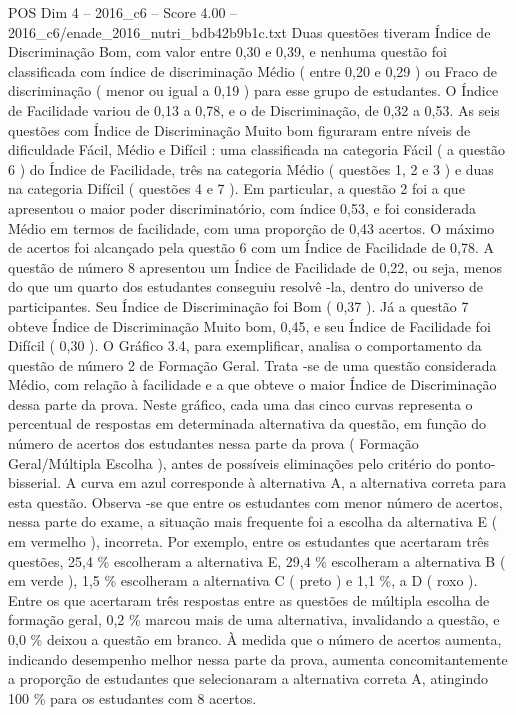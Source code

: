 \begin{textsample}{POS Dim 4 – 2016\_c6 – Score 4.00 – 2016\_c6/enade\_2016\_nutri\_bdb42b9b1c.txt}
Duas questões tiveram Índice de Discriminação Bom, com valor entre 0,30 e 0,39, e nenhuma questão foi classificada com índice de discriminação Médio ( entre 0,20 e 0,29 ) ou Fraco de discriminação ( menor ou igual a 0,19 ) para esse grupo de estudantes.
O Índice de Facilidade variou de 0,13 a 0,78, e o de Discriminação, de 0,32 a 0,53.
As seis questões com Índice de Discriminação Muito bom figuraram entre níveis de dificuldade Fácil, Médio e Difícil : uma classificada na categoria Fácil ( a questão 6 ) do Índice de Facilidade, três na categoria Médio ( questões 1, 2 e 3 ) e duas na categoria Difícil ( questões 4 e 7 ).
Em particular, a questão 2 foi a que apresentou o maior poder discriminatório, com índice 0,53, e foi considerada Médio em termos de facilidade, com uma proporção de 0,43 acertos.
O máximo de acertos foi alcançado pela questão 6 com um Índice de Facilidade de 0,78.
A questão de número 8 apresentou um Índice de Facilidade de 0,22, ou seja, menos do que um quarto dos estudantes conseguiu resolvê -la, dentro do universo de participantes.
Seu Índice de Discriminação foi Bom ( 0,37 ).
Já a questão 7 obteve Índice de Discriminação Muito bom, 0,45, e seu Índice de Facilidade foi Difícil ( 0,30 ).
O Gráfico 3.4, para exemplificar, analisa o comportamento da questão de número 2 de Formação Geral.
Trata -se de uma questão considerada Médio, com relação à facilidade e a que obteve o maior Índice de Discriminação dessa parte da prova.
Neste gráfico, cada uma das cinco curvas representa o percentual de respostas em determinada alternativa da questão, em função do número de acertos dos estudantes nessa parte da prova ( Formação Geral/Múltipla Escolha ), antes de possíveis eliminações pelo critério do ponto-bisserial.
A curva em azul corresponde à alternativa A, a alternativa correta para esta questão.
Observa -se que entre os estudantes com menor número de acertos, nessa parte do exame, a situação mais frequente foi a escolha da alternativa E ( em vermelho ), incorreta.
Por exemplo, entre os estudantes que acertaram três questões, 25,4 \% escolheram a alternativa E, 29,4 \% escolheram a alternativa B ( em verde ), 1,5 \% escolheram a alternativa C ( preto ) e 1,1 \%, a D ( roxo ).
Entre os que acertaram três respostas entre as questões de múltipla escolha de formação geral, 0,2 \% marcou mais de uma alternativa, invalidando a questão, e 0,0 \% deixou a questão em branco.
À medida que o número de acertos aumenta, indicando desempenho melhor nessa parte da prova, aumenta concomitantemente a proporção de estudantes que selecionaram a alternativa correta A, atingindo 100 \% para os estudantes com 8 acertos.

\end{textsample}
